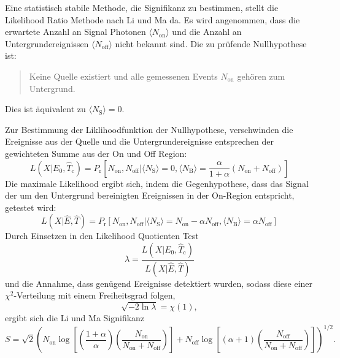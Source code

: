 Eine statistisch stabile Methode, die Signifikanz zu bestimmen, stellt die
Likelihood Ratio Methode nach Li und Ma da.
Es wird angenommen, dass die erwartete Anzahl an Signal
Photonen $\langle N_\text{on} \rangle$ und die Anzahl an Untergrundereignissen
$\langle N_\text{off} \rangle$ nicht bekannt sind.
Die zu prüfende Nullhypothese ist:
\begin{quote}
	Keine Quelle existiert und
    alle gemessenen Events $N_\text{on}$ gehören zum Untergrund.
\end{quote}
Dies ist äquivalent zu $\langle N_\text{S} \rangle=0$.

Zur Bestimmung der Liklihoodfunktion der Nullhypothese,
verschwinden die
Ereignisse aus der Quelle und die Untergrundereignisse entsprechen der
gewichteten Summe aus der On und Off Region:
\begin{equation}
	L(X|E_0, \hat{T}_\text{c})= P_\text{r} \left[
		N_\text{on}, N_\text{off} |
		\langle N_\text{S} \rangle = 0,
		\langle N_\text{B} \rangle = \frac{\alpha}{1 + \alpha} (N_\text{on} +
			N_\text{off})
	\right]
\end{equation}
Die maximale Likelihood ergibt sich,
indem die Gegenhypothese,
dass das Signal der um den Untergrund bereinigten Ereignissen in der On-Region
entspricht,
getestet wird:
\begin{equation}
	L(X|\hat{E}, \hat{T})= P_\text{r} \left[
		N_\text{on}, N_\text{off} |
		\langle N_\text{S} \rangle = N_\text{on} - \alpha N_\text{off},
		\langle N_\text{B} \rangle = \alpha N_\text{off}
	\right]
\end{equation}
Durch Einsetzen in den Likelihood Quotienten Test
\begin{equation}
	\lambda = \frac{L(X|E_0, \hat{T}_\text{c})}{L(X|\hat{E}, \hat{T})}
\end{equation}
und die Annahme, dass genügend Ereignisse detektiert wurden, sodass diese einer
$\chi^2$-Verteilung mit einem Freiheitsgrad folgen,
\begin{equation}
	\sqrt{- 2 \ln \lambda} = \chi(1),
\end{equation}
ergibt sich die Li und Ma Signifikanz
\begin{equation}
  S = \sqrt{2} {\left(
      N_\text{on} \log \left[
        \left( \frac{1 + \alpha}{\alpha} \right) \left(
          \frac{N_\text{on}}{N_\text{on} + N_\text{off}}
        \right)
      \right]
      + N_\text{off} \log \left[
        (\alpha + 1) \left(
          \frac{N_\text{off}}{N_\text{on} + N_\text{off}}
        \right)
      \right]
  \right)} ^ {1/2}.
\end{equation}

